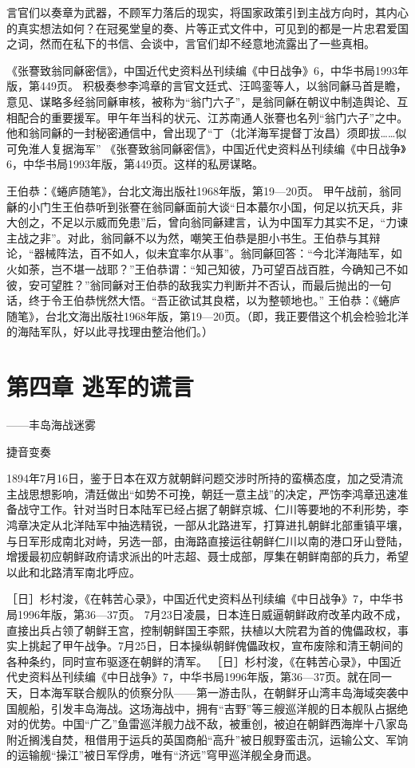 \documentclass[12pt,UTF8]{ctexbook}
\begin{document}
言官们以奏章为武器，不顾军力落后的现实，将国家政策引到主战方向时，其内心的真实想法如何？在冠冕堂皇的奏、片等正式文件中，可见到的都是一片忠君爱国之词，然而在私下的书信、会谈中，言官们却不经意地流露出了一些真相。

《张謇致翁同龢密信》，中国近代史资料丛刊续编《中日战争》6，中华书局1993年版，第449页。
积极奏参李鸿章的言官文廷式、汪鸣銮等人，以翁同龢马首是瞻，意见、谋略多经翁同龢审核，被称为“翁门六子”，是翁同龢在朝议中制造舆论、互相配合的重要援军。甲午年当科的状元、江苏南通人张謇也名列“翁门六子”之中。他和翁同龢的一封秘密通信中，曾出现了“丁（北洋海军提督丁汝昌）须即拔……似可免淮人复据海军” 《张謇致翁同龢密信》，中国近代史资料丛刊续编《中日战争》6，中华书局1993年版，第449页。这样的私房谋略。

王伯恭：《蜷庐随笔》，台北文海出版社1968年版，第19—20页。
甲午战前，翁同龢的小门生王伯恭听到张謇在翁同龢面前大谈“日本蕞尔小国，何足以抗天兵，非大创之，不足以示威而免患”后，曾向翁同龢建言，认为中国军力其实不足，“力谏主战之非”。对此，翁同龢不以为然，嘲笑王伯恭是胆小书生。王伯恭与其辩论，“器械阵法，百不如人，似未宜率尔从事”。翁同龢回答：“今北洋海陆军，如火如荼，岂不堪一战耶？”王伯恭谓：“知己知彼，乃可望百战百胜，今确知己不如彼，安可望胜？”翁同龢对王伯恭的敌我实力判断并不否认，而最后抛出的一句话，终于令王伯恭恍然大悟。“吾正欲试其良楛，以为整顿地也。” 王伯恭：《蜷庐随笔》，台北文海出版社1968年版，第19—20页。（即，我正要借这个机会检验北洋的海陆军队，好以此寻找理由整治他们。）

\chapter{第四章 逃军的谎言}

——丰岛海战迷雾

捷音变奏

1894年7月16日，鉴于日本在双方就朝鲜问题交涉时所持的蛮横态度，加之受清流主战思想影响，清廷做出“如势不可挽，朝廷一意主战”的决定，严饬李鸿章迅速准备战守工作。针对当时日本陆军已经占据了朝鲜京城、仁川等要地的不利形势，李鸿章决定从北洋陆军中抽选精锐，一部从北路进军，打算进扎朝鲜北部重镇平壤，与日军形成南北对峙，另选一部，由海路直接运往朝鲜仁川以南的港口牙山登陆，增援最初应朝鲜政府请求派出的叶志超、聂士成部，厚集在朝鲜南部的兵力，希望以此和北路清军南北呼应。

［日］杉村浚，《在韩苦心录》，中国近代史资料丛刊续编《中日战争》7，中华书局1996年版，第36—37页。
7月23日凌晨，日本连日威逼朝鲜政府改革内政不成，直接出兵占领了朝鲜王宫，控制朝鲜国王李熙，扶植以大院君为首的傀儡政权，事实上挑起了甲午战争。7月25日，日本操纵朝鲜傀儡政权，宣布废除和清王朝间的各种条约，同时宣布驱逐在朝鲜的清军。 ［日］杉村浚，《在韩苦心录》，中国近代史资料丛刊续编《中日战争》7，中华书局1996年版，第36—37页。就在同一天，日本海军联合舰队的侦察分队——第一游击队，在朝鲜牙山湾丰岛海域突袭中国舰船，引发丰岛海战。这场海战中，拥有“吉野”等三艘巡洋舰的日本舰队占据绝对的优势。中国“广乙”鱼雷巡洋舰力战不敌，被重创，被迫在朝鲜西海岸十八家岛附近搁浅自焚，租借用于运兵的英国商船“高升”被日舰野蛮击沉，运输公文、军饷的运输舰“操江”被日军俘虏，唯有“济远”穹甲巡洋舰全身而退。
\end{document}
